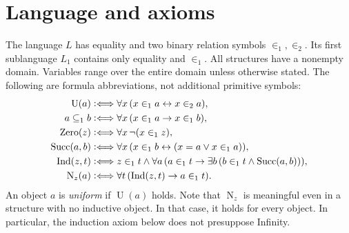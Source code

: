 \documentclass[11pt,a4paper]{article}
\numberwithin{equation}{section}
\theoremstyle{definition}
\theoremstyle{remark}
\newcommand{\Unif}{\operatorname{U}}
\newcommand{\Zero}{\operatorname{Zero}}
\newcommand{\Succ}{\operatorname{Succ}}
\newcommand{\Ind}{\operatorname{Ind}}
\newcommand{\Nat}{\operatorname{N}}
\newcommand{\subone}{\subseteq_1}
\newcommand{\extone}{\in_1}
\newcommand{\exttwo}{\in_2}
\newcommand{\defiff}{\mathrel{\vcentcolon\Longleftrightarrow}}
\begin{document}
\section{Language and axioms}\label{sec:axioms}
The language $L$ has equality and two binary relation symbols $\extone,\exttwo$. Its first sublanguage $L_1$ contains only equality and $\extone$. All structures have a nonempty domain. Variables range over the entire domain unless otherwise stated. The following are formula abbreviations, not additional primitive symbols:
\begin{align*}
\Unif(a)&\defiff\forall x\,(x\extone a\leftrightarrow x\exttwo a),\\
a\subone b&\defiff\forall x\,(x\extone a\to x\extone b),\\
\Zero(z)&\defiff\forall x\,\neg(x\extone z),\\
\Succ(a,b)&\defiff\forall x\,(x\extone b\leftrightarrow(x=a\lor x\extone a)),\\
\Ind(z,t)&\defiff z\extone t\land
 \forall a\,(a\extone t\to\exists b\,(b\extone t\land\Succ(a,b))),\\
\Nat_z(a)&\defiff\forall t\,(\Ind(z,t)\to a\extone t).
\end{align*}
An object $a$ is \emph{uniform} if $\Unif(a)$ holds. Note that $\Nat_z$ is meaningful even in a structure with no inductive object. In that case, it holds for every object. In particular, the induction axiom below does not presuppose Infinity.
\end{document}
